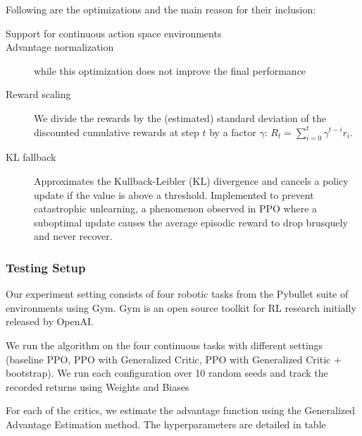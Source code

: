 Following are the optimizations and the main reason for their inclusion:

\begin{description}
\item[Support for continuous action space environments] %
\item[Advantage normalization] while this optimization does not improve the final performance\cite{andrychowicz2020learning}
\item[Reward scaling] We divide the rewards by the (estimated) standard deviation of the discounted cumulative rewards at step $t$ by a factor $\gamma$: $R_t = \sum_{i=0}^t \gamma^{t-i} r_i$. %
\item[KL fallback] Approximates the Kullback-Leibler (KL) divergence and cancels a policy update if the value is above a threshold. Implemented to prevent catastrophic unlearning\cite{dossa2021empirical}, a phenomenon observed in PPO where a suboptimal update causes the average episodic reward to drop brusquely and never recover.
\end{description}

\subsubsection{Testing Setup}

Our experiment setting consists of four robotic tasks from the Pybullet suite of environments using Gym. Gym\cite{brockman2016openai} is an open source toolkit for RL research initially released by OpenAI. 

We run the algorithm on the four continuous tasks with different settings (baseline PPO, PPO with Generalized Critic, PPO with Generalized Critic + bootstrap). We run each configuration over 10 random seeds and track the recorded returns using Weights and Biases\cite{wandb}

For each of the critics, we estimate the advantage function using the Generalized Advantage Estimation method\cite{schulman2015highdimensional}.
The hyperparameters are detailed in table %

